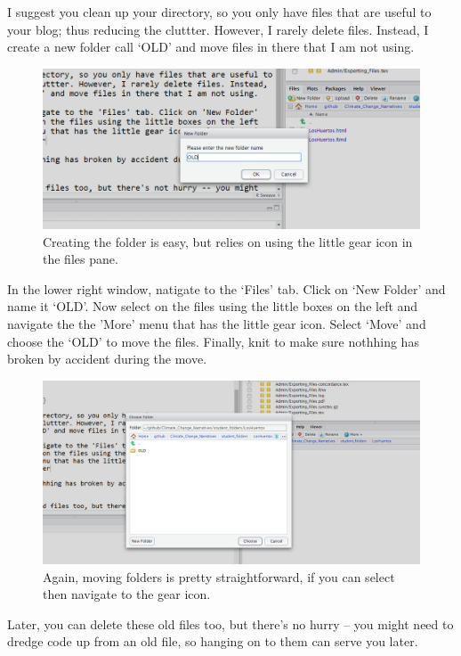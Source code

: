 \documentclass{article}\usepackage[]{graphicx}\usepackage[]{color}
\begin{document}
I suggest you clean up your directory, so you only have files that are useful to your blog; thus reducing the cluttter. However, I rarely delete files. Instead, I create a new folder call `OLD' and move files in there that I am not using.

\begin{figure}
\includegraphics[width=\textwidth]{CreateFolder}
\caption{Creating the folder is easy, but relies on using the little gear icon in the files pane.}
\end{figure}

In the lower right window, natigate to the `Files' tab. Click on `New Folder' and name it `OLD'. Now select on the files using the little boxes on the left and navigate the the 'More' menu that has the little gear icon. Select `Move' and choose the `OLD' to move the files. Finally, knit to make sure nothhing has broken by accident during the move. 

\begin{figure}
\includegraphics[width=\textwidth]{MoveFiles}
\caption{Again, moving folders is pretty straightforward, if you can select then navigate to the gear icon.}
\end{figure}

Later, you can delete these old files too, but there's no hurry -- you might need to dredge code up from an old file, so hanging on to them can serve you later. 
\end{document}
